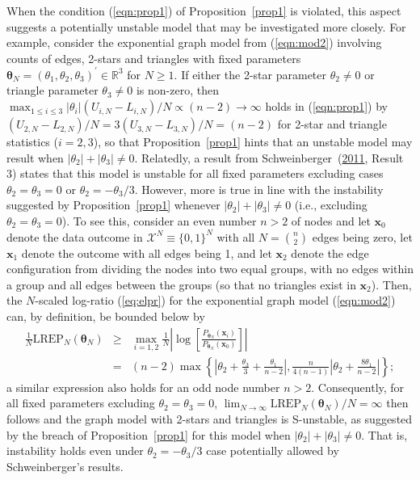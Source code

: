 \documentclass[12pt]{article}
\theoremstyle{definition}
\newcommand{\REP}{\mathrm{LREP}}
\begin{document}
 When the condition (\ref{eqn:prop1}) of Proposition~\ref{prop1} is violated, this aspect suggests a potentially unstable model that may be investigated more closely.
 For example,  consider the exponential graph model from (\ref{eqn:mod2}) involving counts of edges, 2-stars and triangles
    with fixed parameters $\boldsymbol \theta_N = (\theta_{1},\theta_2,\theta_3)^\prime \in \mathbb{R}^3$ for $N\geq 1$.
    If either the 2-star parameter $\theta_2 \neq 0$ or triangle parameter $\theta_3 \neq 0$ is non-zero, then   $ \max_{1 \leq i \leq 3 } |\theta_{i}|(U_{i,N}-L_{i,N})/N \propto (n-2)\to \infty$ holds in (\ref{eqn:prop1}) by  $(U_{2,N}-L_{2,N})/N = 3 (U_{3,N}-L_{3,N})/N=(n-2)$
     for 2-star and triangle statistics ($i=2,3$),
      so that Proposition~\ref{prop1} hints that an unstable model  may result when $|\theta_2| + |\theta_3| \neq 0$.
   Relatedly, a result from Schweinberger~(\protect\hyperlink{ref-schweinberger2011instability}{2011}, Result 3) states that this model is unstable
    for all fixed parameters excluding cases $\theta_2 =\theta_3=0$ or $\theta_2 = - \theta_3/3$.  However, more is true in line with the instability suggested by Proposition~\ref{prop1} whenever $|\theta_2| + |\theta_3| \neq 0$ (i.e., excluding $\theta_2 =\theta_3=0$).
      To see this, consider an even number $n>2$ of nodes and let $ \boldsymbol x_0 $ denote the data outcome in $\mathcal{X}^N \equiv \{0,1\}^N$ with all $N = {n \choose 2}$ edges being zero,
       let $ \boldsymbol x_1 $ denote the outcome with all edges being 1, and let
      $ \boldsymbol x_2$  denote  the edge configuration from dividing the nodes into two equal groups, with no edges within a group and all edges between the groups (so that no triangles exist in $ \boldsymbol x_2$).  Then, the $N$-scaled  log-ratio (\ref{eq:elpr}) for the exponential graph model   (\ref{eqn:mod2}) can, by definition, be bounded below by
    \begin{eqnarray*}
     \frac{1}{N}\REP_N(\boldsymbol \theta_N) & \geq& \max_{i=1,2}\frac{1}{N}
     \left| \log\left[ \frac{P_{\boldsymbol \theta_N}(\boldsymbol x_i)}{P_{\boldsymbol \theta_N}(\boldsymbol x_0)}\right] \right| \\
      &=& (n-2) \max\left\{ \left| \theta_2 + \frac{\theta_3}{3}+\frac{\theta_1}{n-2} \right|, \frac{n}{4(n-1)} \left| \theta_2 + \frac{8\theta_1}{n-2} \right| \right\};
     \end{eqnarray*}
a similar expression also holds for an odd node number $n>2$.
    Consequently,  for all fixed parameters excluding $\theta_2=\theta_3=0$,   $\lim_{N\to \infty}\REP_N(\boldsymbol \theta_N)/N=\infty$ then follows and the graph model with 2-stars and triangles is S-unstable, as suggested by the breach of Proposition~\ref{prop1} for this model
     when $|\theta_2|+|\theta_3|\neq 0$.  That is, instability holds even under  $\theta_2 = - \theta_3/3$ case potentially allowed by Schweinberger's results.
\end{document}
